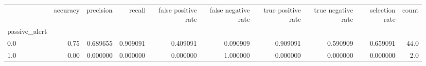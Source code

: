 \begin{tabular}{lrrrrrrrrr}
\toprule
{} &  accuracy &  precision &    recall &  false positive rate &  false negative rate &  true positive rate &  true negative rate &  selection rate &  count \\
passive\_alert &           &            &           &                      &                      &                     &                     &                 &        \\
\midrule
0.0           &      0.75 &   0.689655 &  0.909091 &             0.409091 &             0.090909 &            0.909091 &            0.590909 &        0.659091 &   44.0 \\
1.0           &      0.00 &   0.000000 &  0.000000 &             0.000000 &             1.000000 &            0.000000 &            0.000000 &        0.000000 &    2.0 \\
\bottomrule
\end{tabular}
